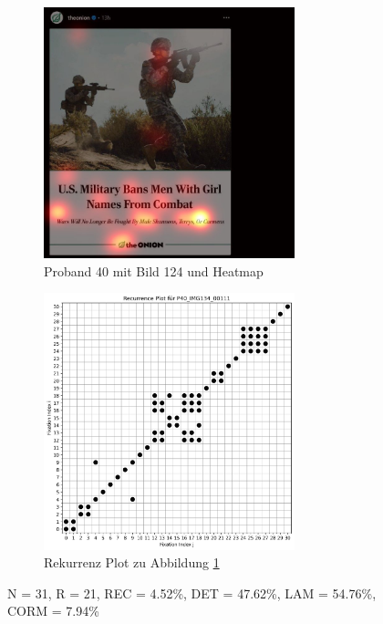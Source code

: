 \documentclass[
    language=german, %
    thesis=seminar, %
    supervisor=postdoc, %
    multiauthor=true, %
    ]{settings/csssa-thesis}
\begin{document}
\begin{figure}[ht]
    \centering
    \begin{subfigure}{0.49\textwidth}
        \centering
        \includegraphics[width=0.8\textwidth]{figures/Bild21.jpeg}
        \caption{Proband 40 mit Bild 124 und Heatmap}\label{fig:Bild18a}
    \end{subfigure}
    \begin{subfigure}{0.49\textwidth}
        \centering
        \includegraphics[width=0.8\textwidth]{figures/Bild22.jpeg}
        \caption{Rekurrenz Plot zu Abbildung \ref{fig:Bild18a}}\label{fig:Bild18b}
    \end{subfigure}\label{fig:Bild18}
    \caption{N = 31, R = 21, REC = 4.52\%, DET = 47.62\%, LAM = 54.76\%, CORM = 7.94\%}
\end{figure}
\end{document}
